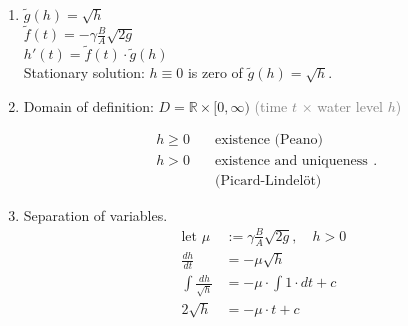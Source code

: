 \documentclass[]{article}
\begin{document}
	\begin{enumerate}
		\item $\tilde g(h) =\sqrt h$\\
			$\tilde f(t)=-\gamma \frac{B}{A}\sqrt{2g}$\\
			$h'(t)=\tilde f(t) \cdot \tilde g(h)$\\
			Stationary solution: $h\equiv 0$ is zero of $\tilde g(h) = \sqrt h$.
		\item Domain of definition: $D= \mathbb R\times [0,\infty)$ \textcolor{gray}{(time $t$ $\times$ water level $h$)}
			\begin{multicols}{2}
			\begin{center}
			\end{center}
			$\quad$
			\[
				\begin{split}
					h\ge 0 \quad & \text{existence (Peano)} \\
				h >0\quad & \text{existence and uniqueness}\\
					  & \text{(Picard-Lindelöt)}
				\end{split}
			.\]
			\end{multicols}
		\item Separation of variables.
		\[
		\begin{split}
		\text{let } \mu & := \gamma \frac{B}{A}\sqrt{2g},\quad h > 0 \\
		\frac{dh}{dt} & = -\mu \sqrt{h} \\
		\int \frac{dh}{\sqrt{h}} & = -\mu \cdot \int 1 \cdot dt + c \\
		2\sqrt{h} & = -\mu \cdot t + c
		\end{split}
		\]
	\end{enumerate}	
\end{document}
